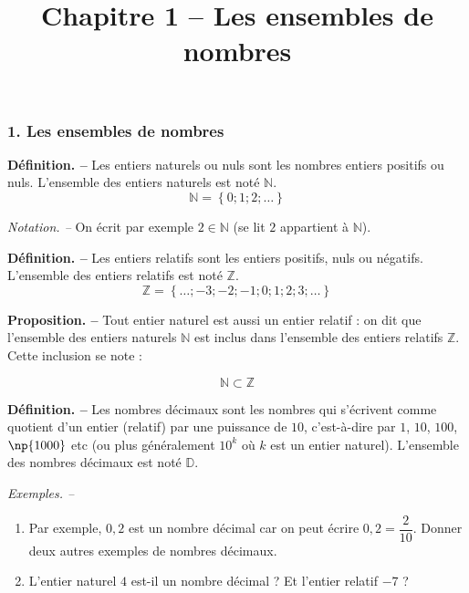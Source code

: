 \documentclass[handout]{beamer}
\begin{document}
\title{Chapitre 1 -- Les ensembles de nombres}

\date{}

\maketitle{}

\begin{frame}
  \frametitle{1. Les ensembles de nombres}
  \textbf{Définition. --} Les entiers naturels ou nuls sont\pause{} les nombres entiers positifs ou nuls.\pause{} L'ensemble des entiers naturels est noté $\mathbb{N}$.\pause{}
  \[\mathbb{N}=\left\{0;1;2;\hdots\right\}\]\pause{}

  \textit{Notation. --} On écrit par exemple $2\in\mathbb{N}$\pause{} (se lit \og{}$2$ appartient à $\mathbb{N}$\fg{}).
\end{frame}

\begin{frame}
  \textbf{Définition. --} Les entiers relatifs sont\pause{} les entiers positifs, nuls ou négatifs.\pause{} L'ensemble des entiers relatifs est noté $\mathbb{Z}$.\pause{}
  \[\mathbb{Z}=\left\{\hdots;-3;-2;-1;0;1;2;3;\hdots\right\}\]\pause{}

  \bigskip

  \textbf{Proposition. --} Tout entier naturel est aussi un entier relatif :\pause{} on dit que l'ensemble des entiers naturels $\mathbb{N}$ est inclus dans l'ensemble des entiers relatifs $\mathbb{Z}$.\pause{} Cette inclusion se note :

  \[\mathbb{N}\subset\mathbb{Z}\]
\end{frame}

\begin{frame}
  \textbf{Définition. --} Les nombres décimaux sont\pause{} les nombres qui s'écrivent comme quotient d'un entier (relatif) par une puissance de $10$, c'est-à-dire par $1$, $10$, $100$, $\np{1000}$ etc (ou plus généralement $10^k$ où $k$ est un entier naturel).\pause{}
  L'ensemble des nombres décimaux est noté $\mathbb{D}$.\pause{}

  \bigskip

  \textit{Exemples. --} \begin{enumerate}
    \item Par exemple, $0,2$ est un nombre décimal car on peut écrire $0,2=\dfrac{2}{10}$. Donner deux autres exemples de nombres décimaux.
    \item L'entier naturel $4$ est-il un nombre décimal ? Et l'entier relatif $-7$ ?
  \end{enumerate}
\end{frame}
\end{document}
